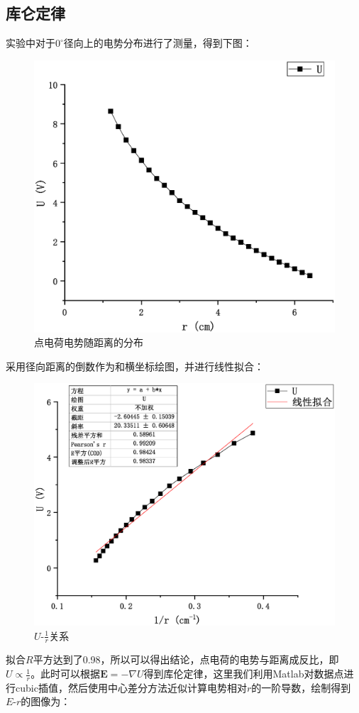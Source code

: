 \documentclass{WHUReport}
\begin{document}
\begin{multicols}{2}
	\subsection{库仑定律}
	实验中对于$0^\circ$径向上的电势分布进行了测量，得到下图：
	\begin{figure}[H]
		\centering
		\includegraphics[width=0.85\linewidth]{figs/U-R.eps}
		\caption{点电荷电势随距离的分布}
	\end{figure}
	采用径向距离的倒数作为和横坐标绘图，并进行线性拟合：
	\begin{figure}[H]
		\centering
		\includegraphics[width=0.85\linewidth]{figs/U-R-1.eps}
		\caption{$U\mbox{-}\frac{1}{r}$关系}
	\end{figure}
	拟合$R$平方达到了0.98，所以可以得出结论，点电荷的电势与距离成反比，即$U\propto \frac{1}{r}$。此时可以根据$\mathbf{E}=-\nabla U$得到库伦定律，这里我们利用Matlab对数据点进行cubic插值，然后使用中心差分方法近似计算电势相对$r$的一阶导数，绘制得到$E\mbox{-}r$的图像为：

\end{multicols}
\end{document}
